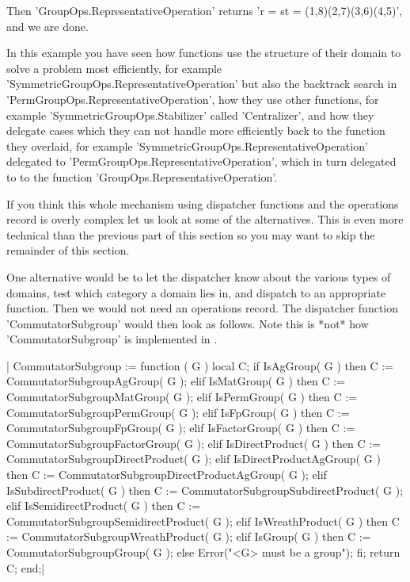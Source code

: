 Then   'GroupOps.RepresentativeOperation'    returns   'r    =   s\*t   =
(1,8)(2,7)(3,6)(4,5)', and we are done.

In  this example you have seen  how functions  use the structure of their
domain    to   solve   a   problem   most    efficiently,   for   example
'SymmetricGroupOps.RepresentativeOperation' but also the backtrack search
in 'PermGroupOps.RepresentativeOperation', how they  use other functions,
for example 'SymmetricGroupOps.Stabilizer' called  'Centralizer', and how
they  delegate  cases which they can not handle  more efficiently back to
the        function        they        overlaid,        for       example
'SymmetricGroupOps.RepresentativeOperation'         delegated          to
'PermGroupOps.RepresentativeOperation', which in turn delegated to to the
function 'GroupOps.RepresentativeOperation'.

If  you think this  whole mechanism using  dispatcher  functions and  the
operations  record  is  overly  complex  let  us  look  at  some  of  the
alternatives.  This is even more technical than the previous part of this
section so you may want to skip the remainder of this section.

One alternative  would be to let the  dispatcher  know about  the various
types of domains, test which category  a domain lies in, and dispatch  to
an  appropriate function.  Then  we  would not need an operations record.
The dispatcher function 'CommutatorSubgroup' would then look as follows.
Note this is *not* how 'CommutatorSubgroup' is implemented in {\GAP}.

|    CommutatorSubgroup := function ( G )
        local   C;
        if IsAgGroup( G )  then
            C := CommutatorSubgroupAgGroup( G );
        elif IsMatGroup( G )  then
            C := CommutatorSubgroupMatGroup( G );
        elif IsPermGroup( G )  then
            C := CommutatorSubgroupPermGroup( G );
        elif IsFpGroup( G )  then
            C := CommutatorSubgroupFpGroup( G );
        elif IsFactorGroup( G )  then
            C := CommutatorSubgroupFactorGroup( G );
        elif IsDirectProduct( G )  then
            C := CommutatorSubgroupDirectProduct( G );
        elif IsDirectProductAgGroup( G )  then
            C := CommutatorSubgroupDirectProductAgGroup( G );
        elif IsSubdirectProduct( G )  then
            C := CommutatorSubgroupSubdirectProduct( G );
        elif IsSemidirectProduct( G )  then
            C := CommutatorSubgroupSemidirectProduct( G );
        elif IsWreathProduct( G )  then
            C := CommutatorSubgroupWreathProduct( G );
        elif IsGroup( G )  then
            C := CommutatorSubgroupGroup( G );
        else
            Error("<G> must be a group");
        fi;
        return C;
    end;|

